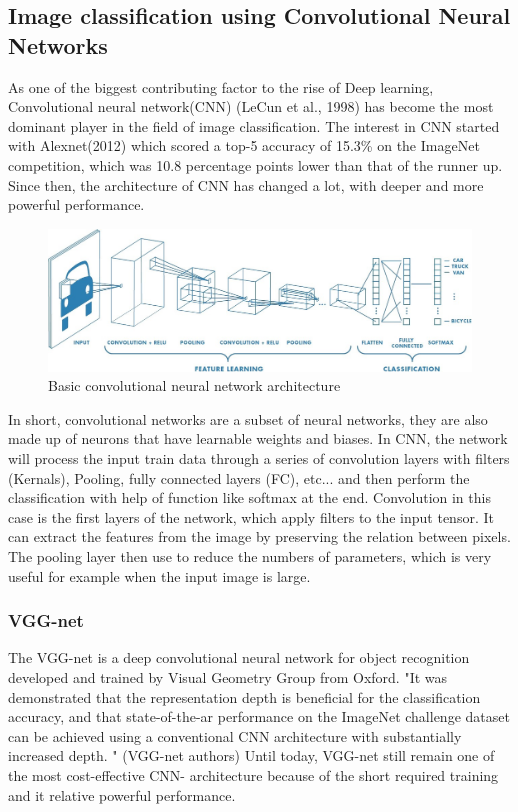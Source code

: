 \subsection{Image classification using Convolutional Neural Networks }
As one of the biggest contributing factor to the rise of Deep learning, Convolutional neural network(CNN) (LeCun et al., 1998) has become the most dominant player in the field of image classification. The interest in CNN started with Alexnet(2012)\cite{CNN} which scored a top-5 accuracy of 15.3\% on the ImageNet competition\cite{ILSVRC15}, which was 10.8 percentage points lower than that of the runner up. Since then, the architecture of CNN has changed a lot, with deeper and more powerful performance. 
\begin{figure}[ht]
\begin{center}
\includegraphics[width=0.5\columnwidth]{Image/CNN.jpeg}
\caption[CNNpic1]{ Basic convolutional neural network architecture \cite{CNNpic}}
\label{fig:BoxesAndArrowsAreNice}
\end{center}
\end{figure}

In short, convolutional networks are a subset of neural networks, they are also made up of neurons that have learnable weights and biases. In CNN, the network will process the input train data through a series of convolution layers with filters (Kernals), Pooling, fully connected layers (FC), etc... and then perform the classification with help of function like softmax at the end.\cite{CNN} Convolution in this case is the first layers of the network, which apply filters to the input tensor. It can extract the features from the image by preserving the relation between pixels. The pooling layer then use to reduce the numbers of parameters, which is very useful for example when the input image is large. 
\subsubsection{VGG-net}
The VGG-net is a deep convolutional neural network for object recognition developed and trained by  Visual Geometry Group from Oxford.\cite{2014arXiv1409.1556S} "It was demonstrated that the representation depth is beneficial for the classification accuracy, and that state-of-the-ar performance on the ImageNet challenge dataset can be achieved using a conventional CNN architecture with substantially increased depth. " (VGG-net authors)
Until today, VGG-net still remain one of the most cost-effective CNN- architecture because of the short required training and it relative powerful performance.

